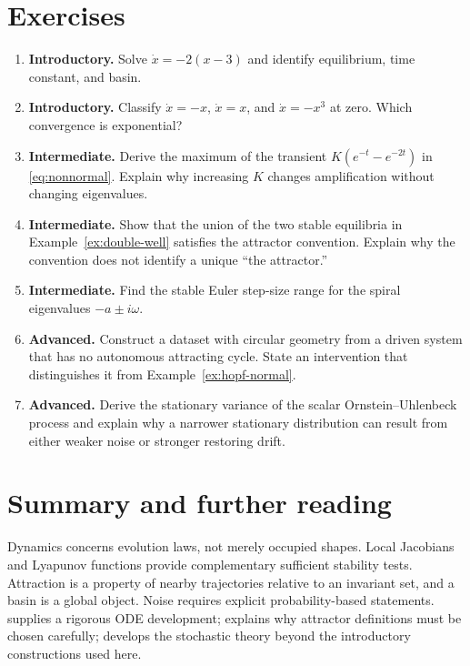 \section{Exercises}
\begin{enumerate}
\item \textbf{Introductory.} Solve $\dot x=-2(x-3)$ and identify equilibrium, time constant, and basin.
\item \textbf{Introductory.} Classify $\dot x=-x$, $\dot x=x$, and $\dot x=-x^3$ at zero. Which convergence is exponential?
\item \textbf{Intermediate.} Derive the maximum of the transient $K(e^{-t}-e^{-2t})$ in \eqref{eq:nonnormal}. Explain why increasing $K$ changes amplification without changing eigenvalues.
\item \textbf{Intermediate.} Show that the union of the two stable equilibria in Example~\ref{ex:double-well} satisfies the attractor convention. Explain why the convention does not identify a unique ``the attractor.''
\item \textbf{Intermediate.} Find the stable Euler step-size range for the spiral eigenvalues $-a\pm i\omega$.
\item \textbf{Advanced.} Construct a dataset with circular geometry from a driven system that has no autonomous attracting cycle. State an intervention that distinguishes it from Example~\ref{ex:hopf-normal}.
\item \textbf{Advanced.} Derive the stationary variance of the scalar Ornstein--Uhlenbeck process and explain why a narrower stationary distribution can result from either weaker noise or stronger restoring drift.
\end{enumerate}

\section{Summary and further reading}
Dynamics concerns evolution laws, not merely occupied shapes. Local Jacobians and Lyapunov functions provide complementary sufficient stability tests. Attraction is a property of nearby trajectories relative to an invariant set, and a basin is a global object. Noise requires explicit probability-based statements. \citet{teschl2012} supplies a rigorous ODE development; \citet{milnor1985} explains why attractor definitions must be chosen carefully; \citet{oksendal2003} develops the stochastic theory beyond the introductory constructions used here.
